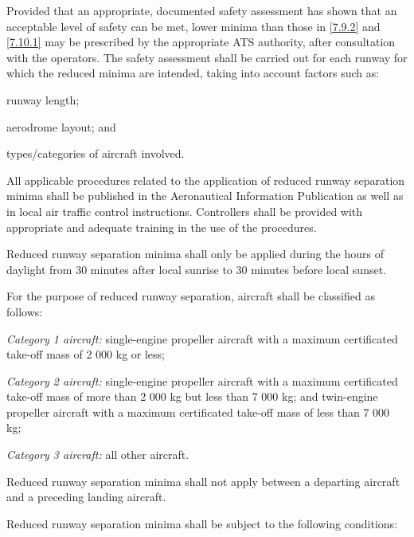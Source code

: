 \begin{enumnoss}
    \item Provided that an appropriate, documented safety assessment has shown that an acceptable level of safety can be met, lower minima than those in \ref{7.9.2} and \ref{7.10.1} may be prescribed by the appropriate ATS authority, after consultation with the operators. The safety assessment shall be carried out for each runway for which the reduced minima are intended, taking into account factors such as:

    \begin{enumalph}
        \item runway length;
        \item aerodrome layout; and
        \item types/categories of aircraft involved.
    \end{enumalph}

    \item All applicable procedures related to the application of reduced runway separation minima shall be published in the Aeronautical Information Publication as well as in local air traffic control instructions. Controllers shall be provided with appropriate and adequate training in the use of the procedures.
    \item Reduced runway separation minima shall only be applied during the hours of daylight from 30 minutes after local sunrise to 30 minutes before local sunset.
    \item For the purpose of reduced runway separation, aircraft shall be classified as follows:

    \begin{enumalph}
        \item \textit{Category 1 aircraft:} single-engine propeller aircraft with a maximum certificated take-off mass of 2 000 kg or less;
        \item \textit{Category 2 aircraft:} single-engine propeller aircraft with a maximum certificated take-off mass of more than 2 000 kg but less than 7 000 kg; and twin-engine propeller aircraft with a maximum certificated take-off mass of less than 7 000 kg;
        \item \textit{Category 3 aircraft:} all other aircraft.
    \end{enumalph}

    \item Reduced runway separation minima shall not apply between a departing aircraft and a preceding landing aircraft.
    \item Reduced runway separation minima shall be subject to the following conditions:


\end{enumnoss}
